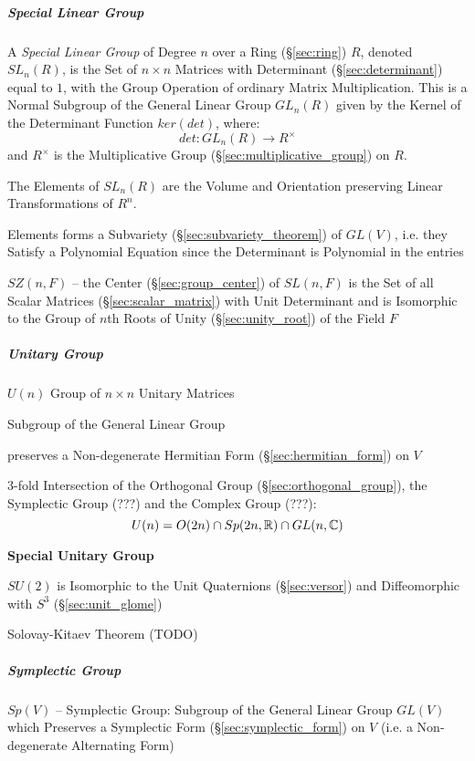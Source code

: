 \subparagraph{Special Linear Group}\label{sec:special_linear_group}\hfill

A \emph{Special Linear Group} of Degree $n$ over a Ring (\S\ref{sec:ring}) $R$,
denoted $SL_n(R)$, is the Set of $n \times n$ Matrices with Determinant
(\S\ref{sec:determinant}) equal to $1$, with the Group Operation of ordinary
Matrix Multiplication. This is a Normal Subgroup of the General Linear Group
$GL_n(R)$ given by the Kernel of the Determinant Function $ker(det)$, where:
\[
  det : GL_n(R) \rightarrow R^\times
\]
and $R^\times$ is the Multiplicative Group
(\S\ref{sec:multiplicative_group}) on $R$.

The Elements of $SL_n(R)$ are the Volume and Orientation preserving
Linear Transformations of $R^n$.

Elements forms a Subvariety (\S\ref{sec:subvariety_theorem}) of $GL(V)$, i.e.
they Satisfy a Polynomial Equation since the Determinant is Polynomial in the
entries

$SZ(n,F)$ -- the Center (\S\ref{sec:group_center}) of $SL(n,F)$ is the Set of
all Scalar Matrices (\S\ref{sec:scalar_matrix}) with Unit Determinant and is
Isomorphic to the Group of $n$th Roots of Unity (\S\ref{sec:unity_root}) of the
Field $F$



\subparagraph{Unitary Group}\label{sec:unitary_group}\hfill

$U(n)$ Group of $n \times n$ Unitary Matrices

Subgroup of the General Linear Group

preserves a Non-degenerate Hermitian Form (\S\ref{sec:hermitian_form}) on $V$

3-fold Intersection of the Orthogonal Group (\S\ref{sec:orthogonal_group}), the
Symplectic Group (???) and the Complex Group (???): %
\[
  U(n) = O(2n) \cap Sp(2n,\mathbb{R}) \cap GL(n,\mathbb{C})
\]



\textbf{Special Unitary Group}

$SU(2)$ is Isomorphic to the Unit Quaternions (\S\ref{sec:versor}) and
Diffeomorphic with $S^3$ (\S\ref{sec:unit_glome})

Solovay-Kitaev Theorem (TODO)



\subparagraph{Symplectic Group}\label{sec:symplectic_group}\hfill

$Sp(V)$ -- Symplectic Group: Subgroup of the General Linear Group $GL(V)$ which
Preserves a Symplectic Form (\S\ref{sec:symplectic_form}) on $V$ (i.e. a
Non-degenerate Alternating Form)




